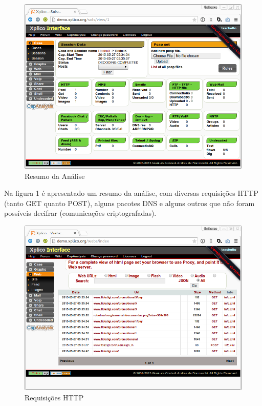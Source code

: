 \documentclass[12pt]{article}
\begin{document}
\begin{figure}[ht]
    \centering
    \includegraphics[scale=0.4]{img/2.png}
    \caption{Resumo da Análise}
    \label{fig:report}
\end{figure}

Na figura 1 é apresentado um resumo da análise, com diversas requisições HTTP (tanto GET quanto POST), alguns pacotes DNS e alguns outros que não foram possíveis decifrar (comunicações criptografadas).

\begin{figure}[ht]
    \centering
    \includegraphics[scale=0.4]{img/1.png}
    \caption{Requisições HTTP}
    \label{fig:http}
\end{figure}
\end{document}
